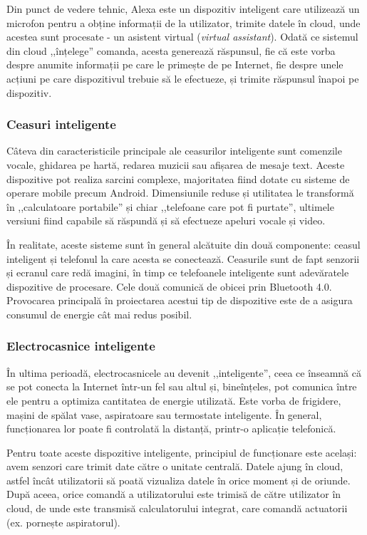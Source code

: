 Din punct de vedere tehnic, Alexa este un dispozitiv inteligent care utilizează un microfon pentru a obține informații de la utilizator, trimite datele în cloud, unde acestea sunt procesate - un asistent virtual (\textit{virtual assistant}).
Odată ce sistemul din cloud ,,înțelege'' comanda, acesta generează răspunsul, fie că este vorba despre anumite informații pe care le primește de pe Internet, fie despre unele acțiuni pe care dispozitivul trebuie să le efectueze, și trimite răspunsul înapoi pe dispozitiv.

\subsubsection{Ceasuri inteligente}
\label{sec:embed:iot:impl:smartwatch}

Câteva din caracteristicile principale ale ceasurilor inteligente sunt comenzile vocale, ghidarea pe hartă, redarea muzicii sau afișarea de mesaje text.
Aceste dispozitive pot realiza sarcini complexe, majoritatea fiind dotate cu sisteme de operare mobile precum Android.
Dimensiunile reduse și utilitatea le transformă în ,,calculatoare portabile'' și chiar ,,telefoane care pot fi purtate'', ultimele versiuni fiind capabile să răspundă și să efectueze apeluri vocale și video.

În realitate, aceste sisteme sunt în general alcătuite din două componente: ceasul inteligent și telefonul la care acesta se conectează.
Ceasurile sunt de fapt senzorii și ecranul care redă imagini, în timp ce telefoanele inteligente sunt adevăratele dispozitive de procesare.
Cele două comunică de obicei prin Bluetooth 4.0.
Provocarea principală în proiectarea acestui tip de dispozitive este de a asigura consumul de energie cât mai redus posibil.

\subsubsection{Electrocasnice inteligente}
\label{sec:embed:iot:impl:home}

În ultima perioadă, electrocasnicele au devenit ,,inteligente'', ceea ce înseamnă că se pot conecta la Internet într-un fel sau altul și, bineînțeles, pot comunica între ele pentru a optimiza cantitatea de energie utilizată.
Este vorba de frigidere, mașini de spălat vase, aspiratoare sau termostate inteligente.
În general, funcționarea lor poate fi controlată la distanță, printr-o aplicație telefonică.

Pentru toate aceste dispozitive inteligente, principiul de funcționare este același: avem senzori care trimit date către o unitate centrală.
Datele ajung în cloud, astfel încât utilizatorii să poată vizualiza datele în orice moment și de oriunde.
După aceea, orice comandă a utilizatorului este trimisă de către utilizator în cloud, de unde este transmisă calculatorului integrat, care comandă actuatorii (ex. pornește aspiratorul).


